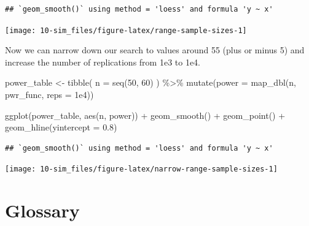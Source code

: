 \documentclass[
  oneside]{book}
\newenvironment{Shaded}{\begin{snugshade}}{\end{snugshade}}
\newcommand{\AttributeTok}[1]{\textcolor[rgb]{0.77,0.63,0.00}{#1}}
\newcommand{\DecValTok}[1]{\textcolor[rgb]{0.00,0.00,0.81}{#1}}
\newcommand{\FloatTok}[1]{\textcolor[rgb]{0.00,0.00,0.81}{#1}}
\newcommand{\FunctionTok}[1]{\textcolor[rgb]{0.00,0.00,0.00}{#1}}
\newcommand{\NormalTok}[1]{#1}
\newcommand{\OtherTok}[1]{\textcolor[rgb]{0.56,0.35,0.01}{#1}}
\newcommand{\SpecialCharTok}[1]{\textcolor[rgb]{0.00,0.00,0.00}{#1}}
\begin{document}
\begin{verbatim}
## `geom_smooth()` using method = 'loess' and formula 'y ~ x'
\end{verbatim}

\begin{center}\texttt{[image: 10-sim\_files/figure-latex/range-sample-sizes-1]} \end{center}

Now we can narrow down our search to values around 55 (plus or minus 5) and increase the number of replications from 1e3 to 1e4.

\begin{Shaded}
\begin{Highlighting}[]
\NormalTok{power\_table }\OtherTok{\textless{}{-}} \FunctionTok{tibble}\NormalTok{(}
  \AttributeTok{n =} \FunctionTok{seq}\NormalTok{(}\DecValTok{50}\NormalTok{, }\DecValTok{60}\NormalTok{)}
\NormalTok{) }\SpecialCharTok{\%\textgreater{}\%}
  \FunctionTok{mutate}\NormalTok{(}\AttributeTok{power =} \FunctionTok{map\_dbl}\NormalTok{(n, pwr\_func, }\AttributeTok{reps =} \FloatTok{1e4}\NormalTok{))}

\FunctionTok{ggplot}\NormalTok{(power\_table, }\FunctionTok{aes}\NormalTok{(n, power)) }\SpecialCharTok{+}
 \FunctionTok{geom\_smooth}\NormalTok{() }\SpecialCharTok{+}
 \FunctionTok{geom\_point}\NormalTok{() }\SpecialCharTok{+}
 \FunctionTok{geom\_hline}\NormalTok{(}\AttributeTok{yintercept =} \FloatTok{0.8}\NormalTok{)}
\end{Highlighting}
\end{Shaded}

\begin{verbatim}
## `geom_smooth()` using method = 'loess' and formula 'y ~ x'
\end{verbatim}

\begin{center}\texttt{[image: 10-sim\_files/figure-latex/narrow-range-sample-sizes-1]} \end{center}

\hypertarget{glossary-sim}{%
\section{Glossary}\label{glossary-sim}}
\end{document}
